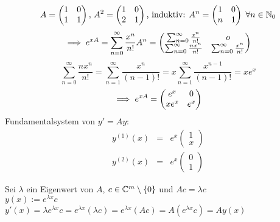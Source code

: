\documentclass[a4paper,twoside,DIV15,BCOR12mm]{scrbook}
\begin{document}
\begin{beispiel}[m=2]
\[ A=\begin{pmatrix}1 & 0 \\ 1 & 1 \end{pmatrix},\, A^2 = \begin{pmatrix} 1 & 0 \\ 2 & 1 \end{pmatrix} \text{, 
induktiv: } A^n = \begin{pmatrix} 1 & 0 \\ n & 1 \end{pmatrix} \; \forall n \in \mathbb{N}_0 \]
\[ \implies e^{xA} = \sum_{n=0}^{\infty} \frac{x^n}{n!}A^n = \begin{pmatrix} \sum_{n=0}^{\infty} \frac{x^n}{n!} & o \\
\sum_{n=0}^{\infty} \frac{nx^n}{n!} & \sum_{n=0}^{\infty} \frac{x^n}{n!} \end{pmatrix} \]
\[\sum_{n=0}^{\infty} \frac{nx^n}{n!} = \sum_{n=1}^{\infty} \frac{x^n}{(n-1)!} = x\sum_{n=1}^{\infty} \frac{x^{n-1}}{(n-1)!} = xe^x \]
\[ \implies e^{xA} = \begin{pmatrix} e^x & 0 \\ xe^x & e^x \end{pmatrix}\]
Fundamentalsystem von $y' = Ay:$  \begin{eqnarray*} y^{(1)}(x) &=& e^x\begin{pmatrix}1\\x \end{pmatrix} \\ y^{(2)}(x) &=& e^x\begin{pmatrix}0\\1\end{pmatrix}\end{eqnarray*} 
\end{beispiel}

\begin{motivation}
Sei $\lambda$ ein Eigenwert von $A$, $c \in \mathbb{C}^m\setminus\{0\}$ und $Ac = \lambda c$ \\
$y(x) := e^{\lambda x}c$\\
$y'(x) = \lambda e^{\lambda x}c = e^{\lambda x}(\lambda c) = e^{\lambda x}(Ac) = A(e^{\lambda x}c) = Ay(x)$
\vspace{1em}
\end{motivation}
\end{document}
